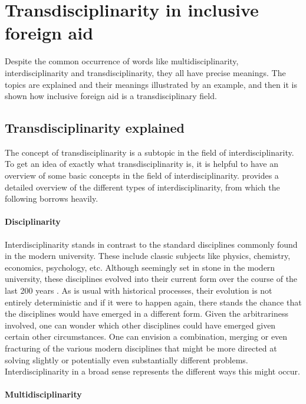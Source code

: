 \documentclass[a4paper]{article}
\begin{document}
\newpage

\section{Transdisciplinarity in inclusive foreign aid}

Despite the common occurrence of words like multidisciplinarity,
interdisciplinarity and transdisciplinarity, they all have precise meanings.
The topics are explained and their meanings illustrated by an example, and
then it is shown how inclusive foreign aid is a transdisciplinary field.

\subsection{Transdisciplinarity explained}

The concept of transdisciplinarity is a subtopic in the field of
interdisciplinarity. To get an idea of exactly what transdisciplinarity is, it
is helpful to have an overview of some basic concepts in the field of
interdisciplinarity. \cite{klein2010taxonomy} provides a detailed overview of
the different types of interdisciplinarity, from which the following borrows
heavily.

\paragraph{Disciplinarity}

Interdisciplinarity stands in contrast to the standard disciplines commonly
found in the modern university. These include classic subjects like physics,
chemistry, economics, psychology, etc. Although seemingly set in stone in the
modern university, these disciplines evolved into their current form over the
course of the last 200 years \citep{weingart2010short}. As is usual with
historical processes, their evolution is not entirely deterministic and if it
were to happen again, there stands the chance that the disciplines would have
emerged in a different form. Given the arbitrariness involved, one can wonder
which other disciplines could have emerged given certain other circumstances.
One can envision a combination, merging or even fracturing of the various
modern disciplines that might be more directed at solving slightly or
potentially even substantially different problems. Interdisciplinarity in a
broad sense represents the different ways this might occur.

\paragraph{Multidisciplinarity}
\end{document}
